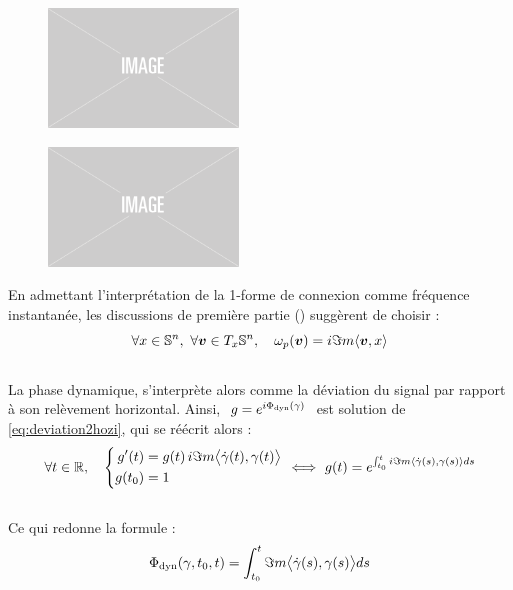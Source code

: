 \begin{figure}[H]
	\begin{floatrow}		
			{\includegraphics[width=0.45\textwidth]{fig/placeholder}}
			
		{\includegraphics[width=0.45\textwidth]{fig/placeholder}}
	\end{floatrow}
\end{figure}

En admettant l'interprétation de la 1-forme de connexion comme fréquence instantanée, les discussions de première partie () suggèrent de choisir :
\begin{equation} \label{eq:conn2SUPC}
	\forall x\in\S{n},\ \forall \bf{v}\in\tg[x]{\S{n}},\quad \conn_p(\bf{v}) = i\Im m \langle \bf{v}, x\rangle
\end{equation}
\\
La phase dynamique, s'interprète alors comme la déviation du signal par rapport à son relèvement horizontal. Ainsi, $\ g = e^{i\phased(\gamma)}\ $ est solution de \eqref{eq:deviation2hozi}, qui se réécrit alors :
\[\forall t\in\R,\quad \left\{ \begin{aligned}
	g'(t)  &= g(t)\, i\Im m \big\langle \dot{\gamma}(t) , \gamma(t) \big\rangle \\
	g(t_0) &= 1
\end{aligned}\ \right. \Llr\ g(t) = e^{\int_{t_0}^t i\Im m\langle \dot{\gamma}(s) , \gamma(s) \rangle ds}\]
\\
Ce qui redonne la formule :
\begin{equation}\label{eq:phased_vgeodiff}
	\phased(\gamma, t_0, t) = \int_{t_0}^t \Im m\big\langle \dot{\gamma}(s) , \gamma(s) \big\rangle ds
\end{equation}
\skipl

